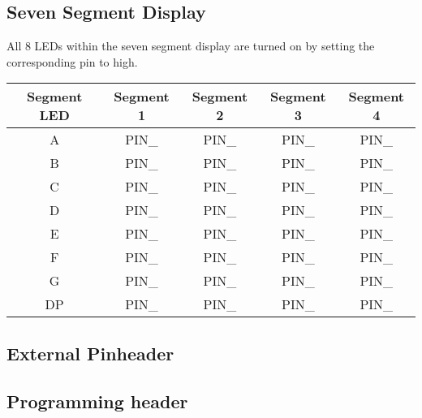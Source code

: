 \subsection{Seven Segment Display}
All 8 LEDs within the seven segment display are turned on by setting the corresponding pin to high.

\begin{center}
	\begin{tabular}{c c c c c}
		Segment LED & Segment 1 & Segment 2 & Segment 3 & Segment 4 \\
		\hline
		A & PIN\_ & PIN\_ & PIN\_ & PIN\_ \\
		B & PIN\_ & PIN\_ & PIN\_ & PIN\_ \\
		C & PIN\_ & PIN\_ & PIN\_ & PIN\_ \\
		D & PIN\_ & PIN\_ & PIN\_ & PIN\_ \\
		E & PIN\_ & PIN\_ & PIN\_ & PIN\_ \\
		F & PIN\_ & PIN\_ & PIN\_ & PIN\_ \\
		G & PIN\_ & PIN\_ & PIN\_ & PIN\_ \\
		DP & PIN\_ & PIN\_ & PIN\_ & PIN\_ \\
		\hline
	\end{tabular}
\end{center}


\subsection{External Pinheader}

\subsection{Programming header}
